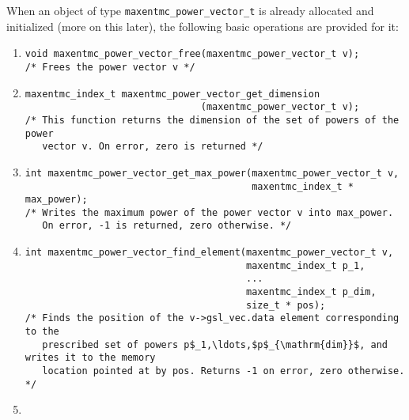 \documentclass[12pt]{amsart}
\numberwithin{equation}{section}
\begin{document}
When an object of type \texttt{maxentmc\_power\_vector\_t} is already
allocated and initialized (more on this later), the following basic
operations are provided for it:
%
\begin{enumerate}[1.]
\item \begin{verbatim}
void maxentmc_power_vector_free(maxentmc_power_vector_t v);
/* Frees the power vector v */
\end{verbatim}
\item  \begin{verbatim}
maxentmc_index_t maxentmc_power_vector_get_dimension
                               (maxentmc_power_vector_t v);
/* This function returns the dimension of the set of powers of the power
   vector v. On error, zero is returned */
\end{verbatim}
\item \begin{verbatim}
int maxentmc_power_vector_get_max_power(maxentmc_power_vector_t v,
                                        maxentmc_index_t * max_power);
/* Writes the maximum power of the power vector v into max_power.
   On error, -1 is returned, zero otherwise. */
\end{verbatim}
\item \begin{verbatim}
int maxentmc_power_vector_find_element(maxentmc_power_vector_t v,
                                       maxentmc_index_t p_1,
                                       ...
                                       maxentmc_index_t p_dim,
                                       size_t * pos);
/* Finds the position of the v->gsl_vec.data element corresponding to the
   prescribed set of powers p$_1,\ldots,$p$_{\mathrm{dim}}$, and writes it to the memory
   location pointed at by pos. Returns -1 on error, zero otherwise. */
\end{verbatim}
\item \begin{verbatim}

\end{verbatim}
\end{enumerate}
\end{document}
